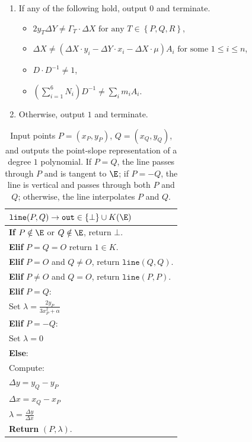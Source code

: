 \documentclass[11pt,letterpaper]{article}
\newcommand{\free}[1]{{\textcolor{red}{#1}}}
\theoremstyle{definition}
\newcommand{\6}{\mathbf}
\newcommand{\7}{\mathcal}
\newcommand{\VerEquA}{2 y_T \Delta Y  \neq \Gamma_T \cdot \Delta X \text{ for any } T \in \left\{P,Q,R\right\}}
\newcommand{\VerEquB}{\Delta X \neq  (\Delta X \cdot y_i - \Delta Y \cdot x_i - \Delta X \cdot \mu) A_i \text{ for some }1 \leq i \leq n}
\newcommand{\VerEquC}{D \cdot D^{-1} \neq 1}
\newcommand{\VerEquD}{\left(\sum_{i=1}^{6} N_i\right) D^{-1} \neq \sum_i m_i A_i}
\begin{document}
\begin{itemize}
\begin{enumerate}
\item  \label{verify4} If any of the following hold, output $0$ and terminate.
\begin{itemize}
\item $\VerEquA$,
\item $\VerEquB$, 
\item $\VerEquC$,
\item $\VerEquD$. 
\end{itemize}
\item  \label{verify5} Otherwise, output $1$ and terminate.

\end{enumerate}

\end{itemize}



\begin{table}[H]
    \centering
    \begin{tabular}{|l|}
    \hline
    $\texttt{line}(P, Q) \to \texttt{out} \in \{\bot\} \cup K(\E)$ \\
    \hline
    \textbf{If} $P \notin \E$ or $Q \notin \E$, return $\bot$. \\
    \textbf{Elif} $P = Q = O$ return $1 \in K$. \\
    \textbf{Elif} $P = O$ and $Q \neq O$, return $\texttt{line}(Q, Q)$. \\
    \textbf{Elif} $P \neq O$ and $Q = O$, return $\texttt{line}(P, P)$. \\
    \textbf{Elif} $P = Q$: \\
    \quad Set $\lambda = \frac{2y_P}{3x_P^2 + \alpha}$ \\
    \textbf{Elif} $P = -Q$: \\
    \quad Set $\lambda = 0$ \\
    \textbf{Else}: \\
    \quad Compute: \\
    \quad\quad $\Delta y = y_Q - y_P$\\
    \quad\quad $\Delta x = x_Q - x_P$\\
    \quad\quad $\lambda = \frac{\Delta y}{\Delta x}$\\
    \textbf{Return} $(P, \lambda)$. \\\hline
    \end{tabular}    
    \caption{
        Input points $P=(x_P,y_P)$, $Q=(x_Q,y_Q)$, and outputs the point-slope representation of a degree $1$ polynomial. If $P = Q$, the line passes through $P$ and is tangent to $\E$; if $P = -Q$, the line is vertical and passes through both $P$ and $Q$; otherwise, the line interpolates $P$ and $Q$. 
    }
    \label{alg:makeline}
\end{table}
\end{document}
